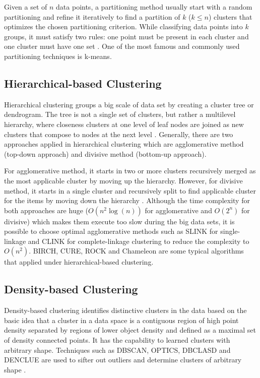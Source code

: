 \documentclass[sigconf]{acmart}
\begin{document}
Given a set of $n$ data points, a partitioning method usually start with a random partitioning and refine it iteratively to find a partition of $k$ ($k \leq n$) clusters that optimizes the chosen partitioning criterion. While classifying data points into $k$ groups, it must satisfy two rules: one point must be present in each cluster and one cluster must have one set \cite{dcar}. One of the most famous and commonly used partitioning techniques is k-means.

\subsection{Hierarchical-based Clustering}

Hierarchical clustering groups a big scale of data set by creating a cluster tree or dendrogram. The tree is not a single set of clusters, but rather a multilevel hierarchy, where closeness clusters at one level of leaf nodes are joined as new clusters that compose to nodes at the next level \cite{math}. Generally, there are two approaches applied in hierarchical clustering which are agglomerative method (top-down approach) and divisive method (bottom-up approach).

For agglomerative method, it starts in two or more clusters recursively merged as the most applicable cluster by moving up the hierarchy. However, for divisive method, it starts in a single cluster and recursively split to find applicable cluster for the items by moving down the hierarchy \cite{dcar}. Although the time complexity for both approaches are huge ($O(n^2\log(n))$ for agglomerative and $O(2^n)$ for divisive) which makes them execute too slow during the big data sets, it is possible to choose optimal agglomerative methods such as SLINK for single-linkage and CLINK for complete-linkage clustering to reduce the complexity to $O(n^2)$. BIRCH, CURE, ROCK and Chameleon are some typical algorithms that applied under hierarchical-based clustering.

\subsection{Density-based Clustering}

Density-based clustering identifies distinctive clusters in the data based on the basic idea that a cluster in a data space is a contiguous region of high point density separated by regions of lower object density \cite{jsdbc} and defined as a maximal set of density connected points. It has the capability to learned clusters with arbitrary shape. Techniques such as DBSCAN, OPTICS, DBCLASD and DENCLUE are used to sifter out outliers and determine clusters of arbitrary shape \cite{dcar}.
\end{document}

